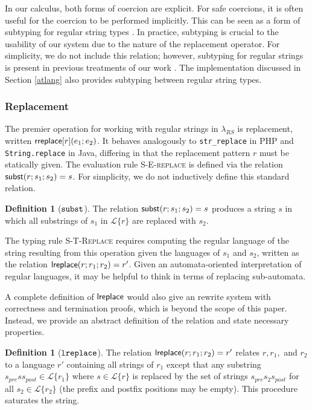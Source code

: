 \documentclass[9pt]{sig-alternate}
\theoremstyle{definition}
\newtheorem{defn}[thm]{Definition}
\newcommand{\Lagr}{\mathcal{L}}
\newcommand{\lang}[1]{\Lagr\{#1\}}
\newcommand{\lambdas}{\lambda_{RS}}
\newcommand{\sisubst}[3]{{\sf rreplace}[#1](#2;#3)} \newcommand{\rreplace}[3]{{\sf rreplace}[#1](#2;#3)} %
\newcommand{\lsubst}[3]{{\sf subst}(#1;#2;#3)} %
\newcommand{\lreplace}[3]{{\sf lreplace}(#1; #2; #3)}
\begin{document}
In our calculus, both forms of coercion are explicit. For safe coercions, it is often useful for the coercion to be performed implicitly. This can be seen as a form of  subtyping for regular string types \cite{fulton13}. 
In practice, subtyping is crucial to the usability of our system due to the nature of the replacement operator.
For simplicity, we do not include this relation; however, subtyping for regular strings is present in previous treatments of our work \cite{fulton12,fulton13}. The implementation discussed in Section \ref{atlang} also provides subtyping between regular string types.

\subsubsection{Replacement}\label{sec:replace}
The premier operation for working with regular strings in $\lambdas$ is  replacement, written $\sisubst{r}{e_1}{e_2}$. 
It behaves analogously to \lstinline{str_replace} in PHP and \lstinline{String.replace} in Java, differing in that the replacement pattern $r$ must be statically given. The evaluation rule \textsc{S-E-replace} is defined via the relation $\lsubst{r}{s_1}{s_2}=s$. For simplicity, we do not inductively define this standard relation. 

\begin{defn}[$\tt{subst}$]
The relation $\lsubst{r}{s_1}{s_2} = s$ produces a string $s$ in which all substrings of $s_1$ in $\lang{r}$ are replaced with $s_2$.
\end{defn}



The typing rule \textsc{S-T-Replace} requires computing the regular language of the string resulting from this operation given the languages of $s_1$ and $s_2$, written as the relation $\lreplace{r}{r_1}{r_2}={r'}$. 
Given an automata-oriented interpretation of regular languages, it may be helpful to think in terms of replacing sub-automata.

A complete definition of ${\sf lreplace}$ would also give an rewrite system with correctness and termination proofs, which is beyond the scope of this paper. Instead, we provide an abstract definition of the relation and state necessary properties.

\begin{defn}[$\tt{lreplace}$]
  The relation $\lreplace{r}{r_1}{r_2} = r'$ relates $r, r_1,$ and $r_2$ to
  a language $r'$ containing all strings of $r_1$ except that any substring $s_{pre} s s_{post} \in \lang{r_1}$ where $s \in \lang{r}$
  is replaced by the set of strings $s_{pre} s_2 s_{post}$ for all $s_2 \in \lang{r_2}$ (the prefix and postfix positions may be empty). This procedure saturates the string.
\end{defn}
\end{document}
